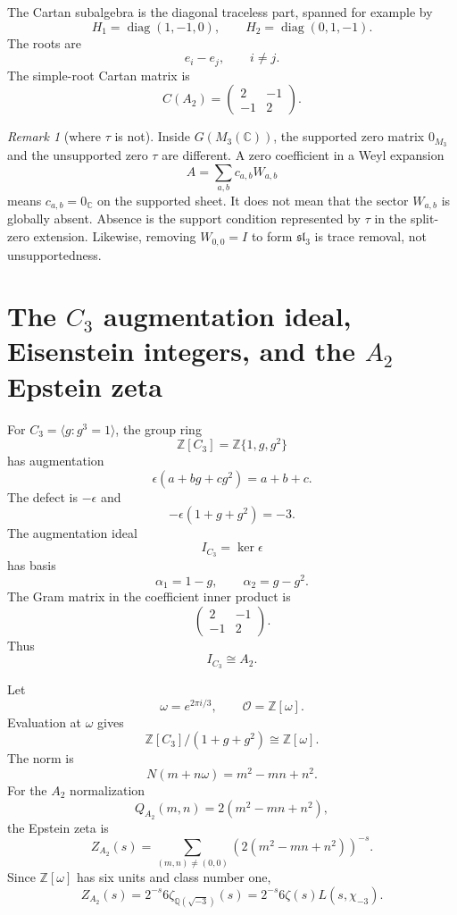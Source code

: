 \documentclass[11pt]{article}
\theoremstyle{remark}
\newtheorem{remark}[theorem]{Remark}
\DeclareMathOperator{\diag}{diag}
\newcommand{\ZZ}{\mathbb Z}
\newcommand{\QQ}{\mathbb Q}
\newcommand{\CC}{\mathbb C}
\newcommand{\OO}{\mathcal O}
\begin{document}
The Cartan subalgebra is the diagonal traceless part, spanned for example by
\[
        H_1=\diag(1,-1,0),
        \qquad
        H_2=\diag(0,1,-1).
\]
The roots are
\[
        e_i-e_j,
        \qquad i\ne j.
\]
The simple-root Cartan matrix is
\[
        C(A_2)=\begin{pmatrix}2&-1\\-1&2\end{pmatrix}.
\]

\begin{remark}[where $\tau$ is not]
Inside $G(M_3(\CC))$, the supported zero matrix $0_{M_3}$ and the unsupported zero $\tau$ are different.  A zero coefficient in a Weyl expansion
\[
        A=\sum_{a,b}c_{a,b}W_{a,b}
\]
means $c_{a,b}=0_\CC$ on the supported sheet.  It does not mean that the sector $W_{a,b}$ is globally absent.  Absence is the support condition represented by $\tau$ in the split-zero extension.  Likewise, removing $W_{0,0}=I$ to form $\mathfrak{sl}_3$ is trace removal, not unsupportedness.
\end{remark}

\section{The $C_3$ augmentation ideal, Eisenstein integers, and the $A_2$ Epstein zeta}

For $C_3=\langle g:g^3=1\rangle$, the group ring
\[
        \ZZ[C_3]=\ZZ\{1,g,g^2\}
\]
has augmentation
\[
        \epsilon(a+bg+cg^2)=a+b+c.
\]
The defect is $-\epsilon$ and
\[
        -\epsilon(1+g+g^2)=-3.
\]
The augmentation ideal
\[
        I_{C_3}=\ker\epsilon
\]
has basis
\[
        \alpha_1=1-g,
        \qquad
        \alpha_2=g-g^2.
\]
The Gram matrix in the coefficient inner product is
\[
        \begin{pmatrix}2&-1\\-1&2\end{pmatrix}.
\]
Thus
\[
        I_{C_3}\cong A_2.
\]

Let
\[
        \omega=e^{2\pi i/3},
        \qquad
        \OO=\ZZ[\omega].
\]
Evaluation at $\omega$ gives
\[
        \ZZ[C_3]/(1+g+g^2)\cong \ZZ[\omega].
\]
The norm is
\[
        N(m+n\omega)=m^2-mn+n^2.
\]
For the $A_2$ normalization
\[
        Q_{A_2}(m,n)=2(m^2-mn+n^2),
\]
the Epstein zeta is
\[
        Z_{A_2}(s)=\sum_{(m,n)\ne(0,0)}\left(2(m^2-mn+n^2)\right)^{-s}.
\]
Since $\ZZ[\omega]$ has six units and class number one,
\[
        Z_{A_2}(s)=2^{-s}6\zeta_{\QQ(\sqrt{-3})}(s)
        =2^{-s}6\zeta(s)L(s,\chi_{-3}).
\]
\end{document}

